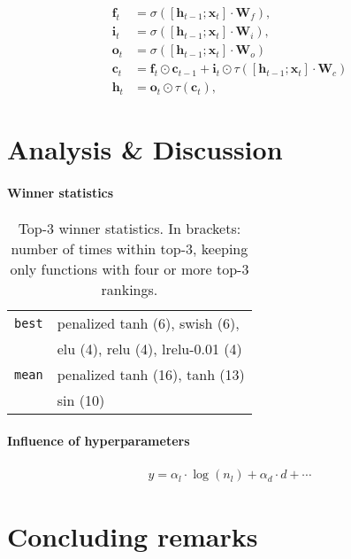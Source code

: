 \documentclass[11pt,a4paper]{article}
\newcommand{\relu}{\textsf{relu}}
\newcommand{\lrelua}{\textsf{lrelu-0.01}}
\newcommand{\swish}{\textsf{swish}}
\newcommand{\pentan}{\textsf{penalized tanh}}
\newcommand{\elu}{\textsf{elu}}
\newcommand{\mytanh}{\textsf{tanh}}
\newcommand{\mysin}{\textsf{sin}}
\newcommand{\best}{\texttt{best}}
\newcommand{\avg}{\texttt{mean}}
\begin{document}
\begin{align*}
  \mathbf{f}_t &= \sigma([\mathbf{h}_{t-1};\mathbf{x}_t]\cdot \mathbf{W}_f),\\
  \mathbf{i}_t &= \sigma([\mathbf{h}_{t-1};\mathbf{x}_t]\cdot \mathbf{W}_i),\\
  \mathbf{o}_t &= \sigma([\mathbf{h}_{t-1};\mathbf{x}_t]\cdot \mathbf{W}_o)\\
  \mathbf{c}_t &= \mathbf{f}_t\odot \mathbf{c}_{t-1}+\mathbf{i}_t\odot\tau([\mathbf{h}_{t-1};\mathbf{x}_t]\cdot \mathbf{W}_c)\\
  \mathbf{h}_t &= \mathbf{o}_t\odot \tau(\mathbf{c}_t),
\end{align*}

\section{Analysis \& Discussion}

\paragraph{Winner statistics}

\begin{table}[!htb]
  \centering
  \begin{tabular}{ll}
  \toprule
    \best{} & \pentan{} (6), \swish{} (6), \\
    & \elu{} (4), \relu{} (4), \lrelua{} (4)\\
    \avg{} & \pentan{} (16), \mytanh{} (13)\\
    & \mysin{} (10) \\
  \bottomrule
  \end{tabular}
  \caption{Top-3 winner statistics. In brackets: number of times within top-3, keeping only functions with four or more top-3 rankings.}
  \label{table:topN}
\end{table}

\paragraph{Influence of hyperparameters}

\begin{align}\label{eq:regression}
  y = \alpha_l\cdot\log(n_l)+\alpha_d\cdot d+\cdots
\end{align}

\section{Concluding remarks}
\end{document}
